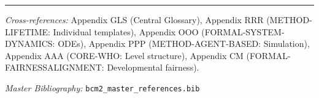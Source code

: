 
\vspace{1em}
\hrule
\vspace{0.5em}

\noindent\textit{Cross-references:}
Appendix GLS (Central Glossary),
Appendix RRR (METHOD-LIFETIME: Individual templates),
Appendix OOO (FORMAL-SYSTEM-DYNAMICS: ODEs),
Appendix PPP (METHOD-AGENT-BASED: Simulation),
Appendix AAA (CORE-WHO: Level structure),
Appendix CM (FORMAL-FAIRNESSALIGNMENT: Developmental fairness).

\noindent\textit{Master Bibliography:} \texttt{bcm2\_master\_references.bib}


